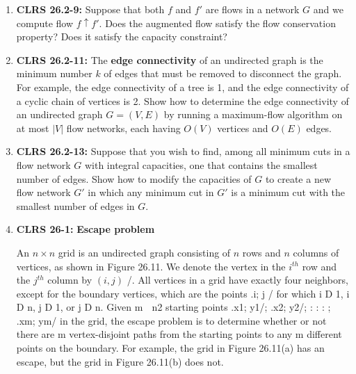 \documentclass[12pt]{article}
\begin{document}
\begin{enumerate}[1.]
    \item \textbf{CLRS 26.2-9:} Suppose that both $f$ and $f'$ are flows in a network $G$ and we compute flow $f \uparrow f'$.
    Does the augmented flow satisfy the flow conservation property? Does it satisfy the capacity constraint?

    \item \textbf{CLRS 26.2-11:} The \textbf{edge connectivity} of an undirected graph is the minimum number $k$ of edges
    that must be removed to disconnect the graph. For example, the edge connectivity
    of a tree is 1, and the edge connectivity of a cyclic chain of vertices is 2. Show
    how to determine the edge connectivity of an undirected graph $G = (V,E)$ by
    running a maximum-flow algorithm on at most $\lvert V \rvert$ flow networks, each having
    $O(V)$ vertices and $O(E)$ edges.

    \item \textbf{CLRS 26.2-13:} Suppose that you wish to find, among all minimum cuts in a flow network $G$ with
    integral capacities, one that contains the smallest number of edges. Show how to
    modify the capacities of $G$ to create a new flow network $G'$ in which any minimum
    cut in $G'$ is a minimum cut with the smallest number of edges in $G$.

    \item \textbf{CLRS 26-1:} \textbf{Escape problem}

    An $n \times n$ grid is an undirected graph consisting of $n$ rows and $n$ columns of vertices,
    as shown in Figure 26.11. We denote the vertex in the $i^{th}$ row and the $j^{th}$ column
    by $(i, j)$ /. All vertices in a grid have exactly four neighbors, except for the boundary
    vertices, which are the points .i; j / for which i D 1, i D n, j D 1, or j D n.
    Given m  n2 starting points .x1; y1/; .x2; y2/; : : : ; .xm; ym/ in the grid, the
    escape problem is to determine whether or not there are m vertex-disjoint paths
    from the starting points to any m different points on the boundary. For example,
    the grid in Figure 26.11(a) has an escape, but the grid in Figure 26.11(b) does not.
\end{enumerate}
\end{document}
